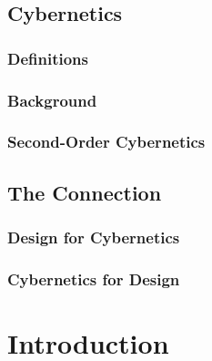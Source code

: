     \subsection{Cybernetics}
        \subsubsection{Definitions}
        \subsubsection{Background}
        \subsubsection{Second-Order Cybernetics}
    \subsection{The Connection}
        \subsubsection{Design for Cybernetics}
        \subsubsection{Cybernetics for Design}
    


\section{Introduction}
